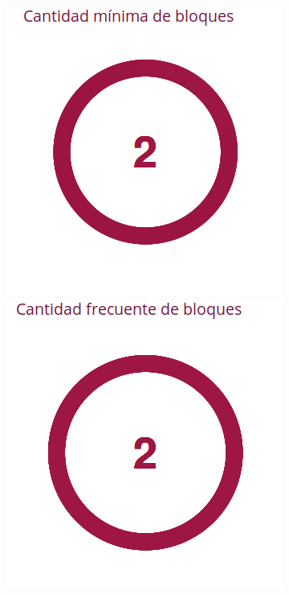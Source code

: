 \documentclass[10,a4paperpaper,]{article}
\begin{document}
\begin{figure}[!htb]
  \begin{minipage}{0.3\textwidth}
    \centering
    \includegraphics[width=1.0\linewidth]{figures/uno.png}
  \end{minipage}\hfill
  \begin{minipage}{0.3\textwidth}
    \centering
    \includegraphics[width=1.0\linewidth]{figures/dos.png}

\end{minipage}
\end{figure}
\end{document}
